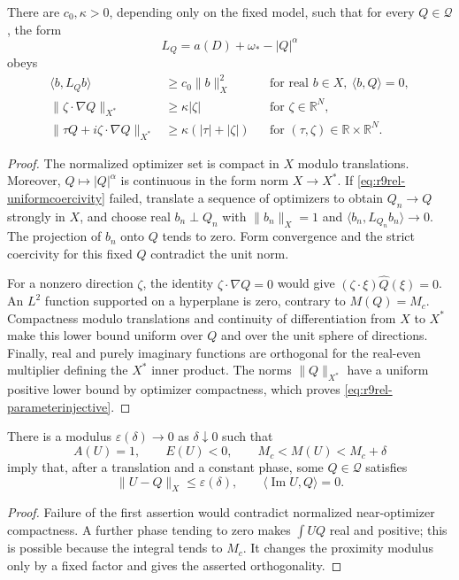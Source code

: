 \begin{lemma}\label{lem:r9rel-uniform}
There are $c_0,\kappa>0$, depending only on the fixed model, such that
for every $Q\in\mathcal Q$, the form
\[
 L_Q=a(D)+\omega_*-|Q|^\alpha
\]
obeys
\begin{align}
 \langle b,L_Qb\rangle&\ge c_0\|b\|_X^2
 &&\text{for real }b\in X,\ \langle b,Q\rangle=0,
 \label{eq:r9rel-uniformcoercivity}\\
 \|\zeta\cdot\nabla Q\|_{X^*}&\ge\kappa|\zeta|
 &&\text{for }\zeta\in\mathbb R^N,
 \label{eq:r9rel-derivativeinjective}\\
 \|\tau Q+i\zeta\cdot\nabla Q\|_{X^*}
 &\ge\kappa(|\tau|+|\zeta|)
 &&\text{for }(\tau,\zeta)\in\mathbb R\times\mathbb R^N.
 \label{eq:r9rel-parameterinjective}
\end{align}
\end{lemma}
\begin{proof}
The normalized optimizer set is compact in $X$ modulo translations.
Moreover, $Q\mapsto |Q|^\alpha$ is continuous in the form norm
$X\to X^*$. If \eqref{eq:r9rel-uniformcoercivity} failed, translate
a sequence of optimizers to obtain $Q_n\to Q$ strongly in $X$, and
choose real $b_n\perp Q_n$ with $\|b_n\|_X=1$ and
$\langle b_n,L_{Q_n}b_n\rangle\to0$.
The projection of $b_n$ onto $Q$ tends to zero. Form convergence and
the strict coercivity for this fixed $Q$ contradict the unit norm.

For a nonzero direction $\zeta$, the identity
$\zeta\cdot\nabla Q=0$ would give
$(\zeta\cdot\xi)\widehat Q(\xi)=0$.
An $L^2$ function supported on a hyperplane is zero, contrary to
$M(Q)=M_c$. Compactness modulo translations and continuity of
differentiation from $X$ to $X^*$ make this lower bound uniform over
$Q$ and over the unit sphere of directions.
Finally, real and purely imaginary functions are orthogonal for
the real-even multiplier defining the $X^*$ inner product.
The norms $\|Q\|_{X^*}$ have a uniform positive lower bound by
optimizer compactness, which proves
\eqref{eq:r9rel-parameterinjective}.
\end{proof}

\begin{lemma}\label{lem:r9rel-proximity}
There is a modulus $\varepsilon(\delta)\to0$ as $\delta\downarrow0$
such that
\[
 A(U)=1,\qquad E(U)<0,\qquad M_c<M(U)<M_c+\delta
\]
imply that, after a translation and a constant phase, some
$Q\in\mathcal Q$ satisfies
\[
 \|U-Q\|_X\le\varepsilon(\delta),\qquad
 \langle\operatorname{Im}U,Q\rangle=0.
\]
\end{lemma}
\begin{proof}
Failure of the first assertion would contradict normalized
near-optimizer compactness. A further phase tending to zero makes
$\int UQ$ real and positive; this is possible because the integral
tends to $M_c$. It changes the proximity modulus only by a fixed
factor and gives the asserted orthogonality.
\end{proof}

